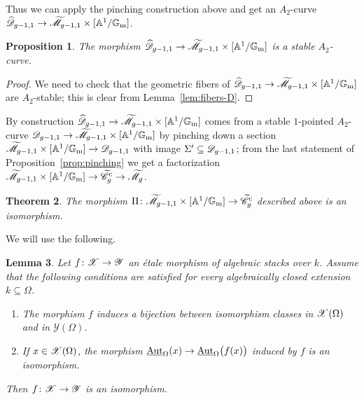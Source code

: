 \documentclass[a4paper, 10pt]{amsart}
\numberwithin{equation}{section}
\numberwithin{subsection}{section}
\newenvironment{enumerate1}
{\begin{enumerate}[\upshape (1)]}
	{\end{enumerate}}
\newtheorem{theorem}{Theorem}[section]
\newtheorem{proposition}[theorem]{Proposition}
\newtheorem{lemma}[theorem]{Lemma}
\theoremstyle{definition}
\theoremstyle{remark}
\renewcommand{\mathcal}{\mathscr}
\newcommand\cY{\mathcal{Y}} \newcommand\cZ{\mathcal{Z}}
\renewcommand\AA{\mathbb{A}} \newcommand\BB{\mathbb{B}}
\newcommand\GG{\mathbb{G}} \newcommand\HH{\mathbb{H}}
\newcommand\rmm{\mathrm{m}} \newcommand\rmn{\mathrm{n}}
\newcommand\arr{\ifinner\to\else\longrightarrow\fi}
\newcommand{\underaut}{\mathop{\underline{\mathrm{Aut}}}\nolimits}
\newcommand{\gm}{\GG_{\rmm}}
\newcommand{\Ctilde}{\widetilde{\mathcal C}}
\newcommand{\cu}{^{\rm c}}
\newcommand{\ag}{[\AA^{1}/\gm]}
\newcommand{\mt}{\widetilde{\mathcal M}}
\begin{document}
	Thus we can apply the pinching construction above and get an $A_2$-curve $\widehat{\cD}_{g-1,1} \arr \mt_{g-1,1}\times \ag$.
	
	\begin{proposition}
		The morphism $\widehat{\cD}_{g-1,1} \arr \mt_{g-1,1}\times \ag$ is a stable $A_2$-curve.
	\end{proposition}
	
	\begin{proof}
		We need to check that the geometric fibers of $\widehat{\cD}_{g-1,1} \arr \mt_{g-1,1}\times \ag$ are $A_2$-stable; this is clear from Lemma~\ref{lem:fibers-D}.
	\end{proof}
	
	By construction $\widehat{\cD}_{g-1,1} \arr \mt_{g-1,1}\times \ag$ comes from a stable $1$-pointed $A_{2}$-curve $\cD_{g-1,1} \arr \mt_{g-1,1}\times \ag$ by pinching down a section $\mt_{g-1,1}\times \ag \arr \cD_{g-1,1}$ with image $\Sigma' \subseteq\cD_{g-1,1}$; from the last statement of Proposition~\ref{prop:pinching} we get a factorization $\mt_{g-1,1}\times \ag \arr \Ctilde_{g}\cu \arr \mt_{g}$.
	
	\begin{theorem}\label{thm:cuspidal-description}
		The morphism $\Pi\colon \mt_{g-1,1}\times \ag \arr \Ctilde_{g}\cu$ described above is an isomorphism.
	\end{theorem}
	
	We will use the following.
	
	\begin{lemma}\label{lem:isom}
		Let $f\colon \cX \arr \cY$ an \'{e}tale morphism of algebraic stacks over $k$. Assume that the following conditions are satisfied for every algebraically closed extension $k \subseteq\Omega$.
		
		\begin{enumerate1}
			
			\item The morphism $f$ induces a bijection between isomorphism classes in $\cX(\Omega)$ and in $\cY(\Omega)$.
			
			\item If $x \in \cX(\Omega)$, the morphism $\underaut_{\Omega}(x) \arr \underaut_{\Omega}\bigl(f(x)\bigr)$ induced by $f$ is an isomorphism.
			
		\end{enumerate1}
		
		Then $f\colon \cX \arr \cY$ is an isomorphism.
	\end{lemma}
	
\end{document}
